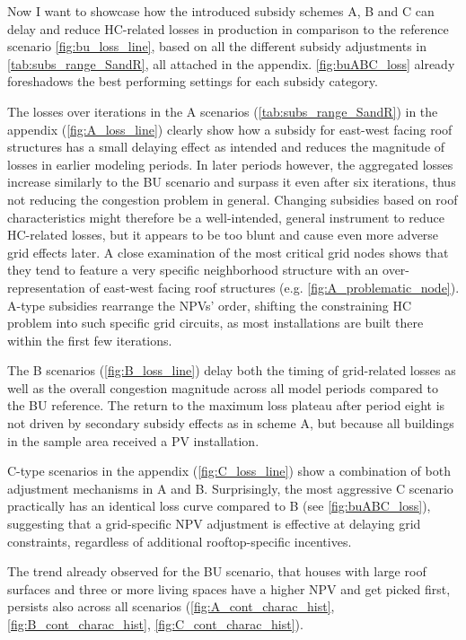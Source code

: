 \documentclass[12PT, ]{article}
\begin{document}
Now I want to showcase how the introduced subsidy schemes A, B and C can delay and reduce HC-related losses in production in comparison to the reference scenario \ref{fig:bu_loss_line}, based on all the different subsidy adjustments in \ref{tab:subs_range_SandR}, all attached in the appendix. \ref{fig:buABC_loss} already foreshadows the best performing settings for each subsidy category. 

The losses over iterations in the A scenarios (\ref{tab:subs_range_SandR}) in the appendix (\ref{fig:A_loss_line}) clearly show how a subsidy for east-west facing roof structures has a small delaying effect as intended and reduces the magnitude of losses in earlier modeling periods. In later periods however, the aggregated losses increase similarly to the BU scenario and surpass it even after six iterations, thus not reducing the congestion problem in general. 
%
Changing subsidies based on roof characteristics might therefore be a well-intended, general instrument to reduce HC-related losses, but it appears to be too blunt and cause even more adverse grid effects later. A close examination of the most critical grid nodes shows that they tend to feature a very specific neighborhood structure with an over-representation of east-west facing roof structures (e.g. \ref{fig:A_problematic_node}). A-type subsidies rearrange the NPVs' order, shifting the constraining HC problem into such specific grid circuits, as most installations are built there within the first few iterations.


The B scenarios (\ref{fig:B_loss_line}) delay both the timing of grid-related losses as well as the overall congestion magnitude across all model periods compared to the BU reference. 
The return to the maximum loss plateau after period eight is not driven by secondary subsidy effects as in scheme A, but because all buildings in the sample area received a PV installation.

C-type scenarios in the appendix (\ref{fig:C_loss_line}) show a combination of both adjustment mechanisms in A and B. Surprisingly, the most aggressive C scenario practically has an identical loss curve compared to B (see \ref{fig:buABC_loss}), suggesting that a grid-specific NPV adjustment is effective at delaying grid constraints, regardless of additional rooftop-specific incentives.

The trend already observed for the BU scenario, that houses with large roof surfaces and three or more living spaces have a higher NPV and get picked first, persists also across all scenarios (\ref{fig:A_cont_charac_hist}, \ref{fig:B_cont_charac_hist}, \ref{fig:C_cont_charac_hist}).
\end{document}

